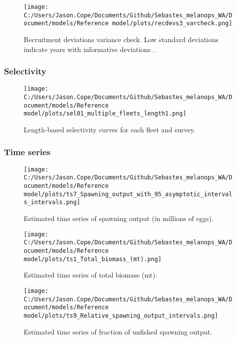 \documentclass[11pt,
  english,
  letterpaper,
]{article}
\begin{document}
\begin{figure}
\centering
\texttt{[image: C:/Users/Jason.Cope/Documents/Github/Sebastes\_melanops\_WA/Document/models/Reference model/plots/recdevs3\_varcheck.png]}
\caption{Recruitment deviations variance check. Low standard deviations indicate years with informative deviations .\label{fig:varcheck}}
\end{figure}

\pagebreak

\hypertarget{selectivity}{%
\subsubsection{Selectivity}\label{selectivity}}

\begin{figure}
\centering
\texttt{[image: C:/Users/Jason.Cope/Documents/Github/Sebastes\_melanops\_WA/Document/models/Reference model/plots/sel01\_multiple\_fleets\_length1.png]}
\caption{Length-based selectivity curves for each fleet and survey.\label{fig:fleet_selectivity}}
\end{figure}

\pagebreak

\hypertarget{time-series}{%
\subsubsection{Time series}\label{time-series}}

\begin{figure}
\centering
\texttt{[image: C:/Users/Jason.Cope/Documents/Github/Sebastes\_melanops\_WA/Document/models/Reference model/plots/ts7\_Spawning\_output\_with\_95\_asymptotic\_intervals\_intervals.png]}
\caption{Estimated time series of spawning output (in millions of eggs).\label{fig:ssb}}
\end{figure}

\pagebreak

\begin{figure}
\centering
\texttt{[image: C:/Users/Jason.Cope/Documents/Github/Sebastes\_melanops\_WA/Document/models/Reference model/plots/ts1\_Total\_biomass\_(mt).png]}
\caption{Estimated time series of total biomass (mt).\label{fig:tot-bio}}
\end{figure}

\pagebreak

\begin{figure}
\centering
\texttt{[image: C:/Users/Jason.Cope/Documents/Github/Sebastes\_melanops\_WA/Document/models/Reference model/plots/ts9\_Relative\_spawning\_output\_intervals.png]}
\caption{Estimated time series of fraction of unfished spawning output.\label{fig:depl}}
\end{figure}
\end{document}
